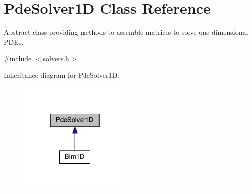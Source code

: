 \hypertarget{classPdeSolver1D}{\section{Pde\-Solver1\-D Class Reference}
\label{classPdeSolver1D}
}


Abstract class providing methods to assemble matrices to solve one-\/dimensional P\-D\-Es.  




{\ttfamily \#include $<$solvers.\-h$>$}



Inheritance diagram for Pde\-Solver1\-D\-:\nopagebreak
\begin{figure}[H]
\begin{center}
\leavevmode
\includegraphics[width=154pt]{classPdeSolver1D__inherit__graph}
\end{center}
\end{figure}

